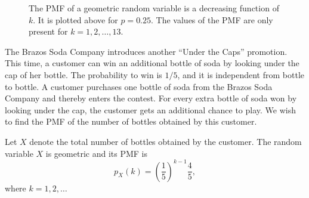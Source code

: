 \begin{figure}[ht]
\begin{center}
\end{center}
\caption{The PMF of a geometric random variable is a decreasing function of $k$.
It is plotted above for $p = 0.25$.
The values of the PMF are only present for $k = 1, 2, \ldots, 13$.}
\end{figure}

\begin{example}
The Brazos Soda Company introduces another ``Under the Caps'' promotion.
This time, a customer can win an additional bottle of soda by looking under the cap of her bottle.
The probability to win is $1/5$, and it is independent from bottle to bottle.
A customer purchases one bottle of soda from the Brazos Soda Company and thereby enters the contest.
For every extra bottle of soda won by looking under the cap, the customer gets an additional chance to play.
We wish to find the PMF of the number of bottles obtained by this customer.

Let $X$ denote the total number of bottles obtained by the customer.
The random variable $X$ is geometric and its PMF is
\begin{equation*}
p_X (k) = \left( \frac{1}{5} \right)^{k-1} \frac{4}{5},
\end{equation*}
where $k = 1, 2, \ldots$
\end{example}

